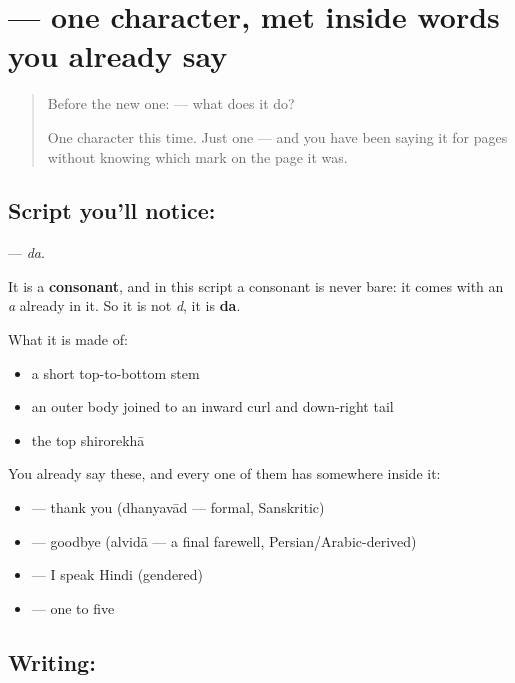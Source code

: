\section[\texorpdfstring{\hi{द} (da)}{द (da)}]{ — one character, met inside words you already say}

\label{lesson:HI-S123-letter-da}



\begin{quote}
Before the new one:  — what does it do?

One character this time. Just one — and you have been saying it for pages without knowing which mark on the page it was.
\end{quote}

\subsection*{Script you'll notice: }
\textbf{} — \emph{da}.

It is a \textbf{consonant}, and in this script a consonant is never bare: it comes with an \emph{a} already in it. So it is not \emph{d}, it is \textbf{da}.

What it is made of:

\begin{itemize}
\raggedright
  \item a short top-to-bottom stem
  \item an outer body joined to an inward curl and down-right tail
  \item the top shirorekhā
\end{itemize}

You already say these, and every one of them has  somewhere inside it:

\begin{itemize}
\raggedright
  \item \textbf{} — thank you (dhanyavād — formal, Sanskritic)
  \item \textbf{} — goodbye (alvidā — a final farewell, Persian/Arabic-derived)
  \item \textbf{   } — I speak Hindi (gendered)
  \item \textbf{    } — one to five
\end{itemize}

\subsection*{Writing: }

